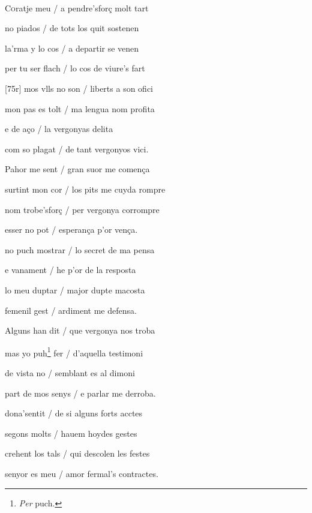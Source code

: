 \documentclass[12pt]{article}
\renewcommand{\espaiAbansEtiquetaPoema}{\vspace{0ex}}
\begin{document}
\begin{estrofa}

\espaiAbansEtiquetaPoema

\\

\end{estrofa}


\begin{estrofa}

 C\textsc{o}ratje meu / a pendre'sfor\c{c} molt tart

 no piados / de tots los quit sostenen

 la'rma y lo cos / a departir se venen

 per tu ser flach / lo cos de viure's fart

 [75r] mos vlls no son / liberts a son ofici

 mon pas es tolt / ma lengua nom profita

 e de a\c{c}o / la vergonyas delita

 com so plagat / de tant vergonyos vici.

\end{estrofa}



\begin{estrofa}

 Pahor me sent / gran suor me comen\c{c}a

 surtint mon cor / los pits me cuyda rompre

 nom trobe'sfor\c{c} / per vergonya corrompre

 esser no pot / esperan\c{c}a p'or ven\c{c}a.

 no puch mostrar / lo secret de ma pensa

 e vanament / he p'or de la resposta

 lo meu duptar / major dupte macosta

 femenil gest / ardiment me defensa.

\end{estrofa}



\begin{estrofa}

 Alguns han dit / que vergonya nos troba

 mas yo puh\footnote{\textit{Per} puch.} fer / d'aquella testimoni

 de vista no / semblant es al dimoni

 part de mos senys / e parlar me derroba.

 dona'sentit / de si alguns forts acctes

 segons molts / hauem hoydes gestes

 crehent los tals / qui descolen les festes

 senyor es meu / amor fermal's contractes.

\end{estrofa}
\end{document}
